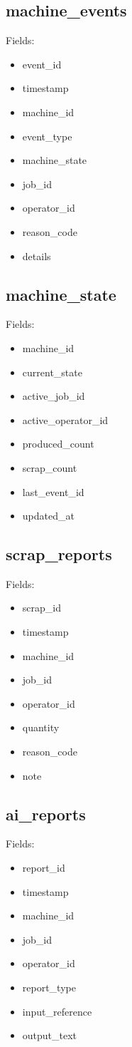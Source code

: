 \documentclass[11pt]{article}
\begin{document}
\subsection{machine\_events}
Fields:
\begin{itemize}
\item event\_id
\item timestamp
\item machine\_id
\item event\_type
\item machine\_state
\item job\_id
\item operator\_id
\item reason\_code
\item details
\end{itemize}

\subsection{machine\_state}
Fields:
\begin{itemize}
\item machine\_id
\item current\_state
\item active\_job\_id
\item active\_operator\_id
\item produced\_count
\item scrap\_count
\item last\_event\_id
\item updated\_at
\end{itemize}

\subsection{scrap\_reports}
Fields:
\begin{itemize}
\item scrap\_id
\item timestamp
\item machine\_id
\item job\_id
\item operator\_id
\item quantity
\item reason\_code
\item note
\end{itemize}

\subsection{ai\_reports}
Fields:
\begin{itemize}
\item report\_id
\item timestamp
\item machine\_id
\item job\_id
\item operator\_id
\item report\_type
\item input\_reference
\item output\_text
\end{itemize}
\end{document}

